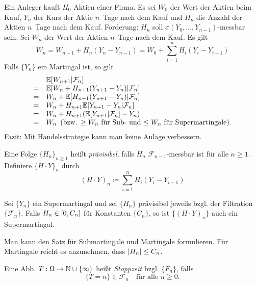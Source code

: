 \documentclass{cheat-sheet}
\newcommand{\E}{\mathbb{E}} %
\newcommand{\Filt}{\mathcal{F}} %
\begin{document}
\begin{bsp}
  Ein Anleger kauft $H_0$ Aktien einer Firma.
  Es sei $W_0$ der Wert der Aktien beim Kauf,
  $Y_n$ der Kurs der Aktie $n$~Tage nach dem Kauf und
  $H_n$ die Anzahl der Aktien $n$~Tage nach dem Kauf.
  Forderung: $H_n$ soll $\sigma(Y_0, \ldots, Y_{n-1})$-messbar sein.
  Sei $W_n$ der Wert der Aktien $n$~Tage nach dem Kauf.
  Es gilt
  \[ W_n = W_{n-1} + H_n (Y_n - Y_{n-1}) = W_0 + {\sum}_{i=1}^n H_i (Y_i - Y_{i-1}) \]
  Falls $\{ Y_n \}$ ein Martingal ist, so gilt
  \[
    \begin{array}{c l}
      & \E[ W_{n+1} | \Filt_n ] \\
      = & \E[ W_n + H_{n+1} (Y_{n+1} - Y_n) | \Filt_n ] \\
      = & W_n + \E[ H_{n+1} (Y_{n+1} - Y_n) | \Filt_n ] \\
      = & W_n + H_{n+1} \E[ Y_{n+1} - Y_n | \Filt_n ] \\
      = & W_n + H_{n+1} (\E[ Y_{n+1} | \Filt_n ] - Y_n) \\
      = & W_n \enspace (\text{bzw. $\geq W_n$ für Sub- und $\leq W_n$ für Supermartingale}).
    \end{array}
  \]
  Fazit: Mit Handelsstrategie kann man keine Anlage verbessern.
\end{bsp}

\begin{defn}
  Eine Folge $\{ H_n \}_{n \geq 1}$ heißt \emph{prävisibel}, falls $H_n$ $\Filt_{n-1}$-messbar ist für alle $n \geq 1$.
  Definiere $\{ H \cdot Y \}_n$ durch
  \[
    (H \cdot Y)_n \coloneqq {\sum}_{i=1}^n H_i (Y_i - Y_{i-1})
  \]
\end{defn}

\begin{satz}
  Sei $\{ Y_n \}$ ein Supermartingal und sei $\{ H_n \}$ prävisibel jeweils bzgl. der Filtration $\{ \Filt_n \}$.
  Falls $H_n \in \left[ 0, C_n \right]$ für Konstanten $\{ C_n \}$, so ist $\{ (H \cdot Y)_n \}$ auch ein Supermartingal.
\end{satz}

\begin{bem}
  Man kann den Satz für Submartingale und Martingale formulieren.
  Für Martingale reicht es anzunehmen, dass $\lvert H_n\rvert \leq C_n$.
\end{bem}

\begin{defn}
  Eine Abb. $T : \Omega \to \mathbb{N} \cup \{ \infty \}$ heißt \emph{Stoppzeit} bzgl. $\{ F_n \}$, falls
  \[
    \{ T=n \} \in \Filt_n
    \quad \text{für alle } n \geq 0.
  \]
\end{defn}
\end{document}
